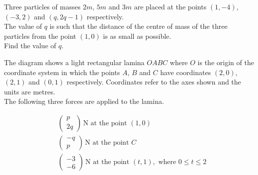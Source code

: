 \documentclass[leqno]{article}
\begin{document}
\begin{enumerate}[
  label=\textbf{\arabic*.},
  leftmargin=*,
  topsep=0pt,
  partopsep=0pt,
  parsep=0pt
]
\newpage

\questionitem

Three particles of masses $2m$, $5m$ and $3m$ are placed at the points $(1, -4)$, $(-3, 2)$ and $(q, 2q - 1)$ respectively. \\

The value of $q$ is such that the distance of the centre of mass of the three particles from the point $(1, 0)$ is as small as possible. \\

Find the value of $q$.  \\

\newpage

\questionitem

\begin{figure}[H]
    \centering
{}
\end{figure}


The diagram shows a light rectangular lamina $OABC$ where $O$ is the origin of the coordinate system in which the points $A$, $B$ and $C$ have coordinates $(2, 0)$, $(2, 1)$ and $(0, 1)$ respectively. Coordinates refer to the axes shown and the units are metres. \\

The following three forces are applied to the lamina. 

\begin{align*}
&\begin{pmatrix}
p \\
2q
\end{pmatrix}\,\mathrm{N} \text{ at the point } (1, 0) \\[1em]
&\begin{pmatrix}
-q \\
p
\end{pmatrix}\,\mathrm{N} \text{ at the point } C \\[1em]
&\begin{pmatrix}
-3 \\
-6
\end{pmatrix}\,\mathrm{N} \text{ at the point } (t, 1), \text{ where } 0 \le t \le 2 \\
\end{align*}


\end{enumerate}
\end{document}
